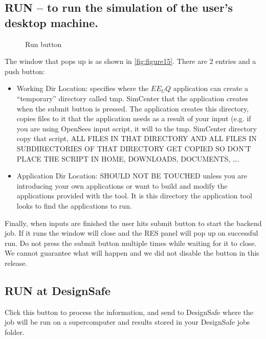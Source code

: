 \subsection{RUN – to run the simulation of the user’s desktop machine.}
\begin{figure}[!htbp]
  \caption{Run button}
  \label{fig:figure15}
\end{figure}
The window that pops up is as shown in \autoref{fig:figure15}. There are 2 entries and a push button: 

\begin{itemize}
\item Working Dir Location: specifies where the $EE_UQ$ application can create a “temporary” directory called tmp. SimCenter that the application 
creates when the submit button is pressed. The application creates this directory, copies files to it that the application needs as a result of your 
input (e.g. if you are using OpenSees input script, it will to the tmp. SimCenter directory copy that script, ALL FILES IN THAT DIRECTORY AND ALL FILES IN 
SUBDIRECTORIES OF THAT DIRECTORY GET COPIED SO DON’T PLACE THE SCRIPT IN HOME, DOWNLOADS, DOCUMENTS, ….
\item Application Dir Location: SHOULD NOT BE TOUCHED unless you are introducing your own applications or want to build and modify the 
applications provided with the tool. It is this directory the application tool looks to find the applications to run.
\end{itemize}


Finally, when inputs are finished the user hits submit button to start the backend job. If it runs the window will close and the RES 
panel will pop up on successful run. Do not press the submit button multiple times while waiting for it to close. We cannot guarantee 
what will happen and we did not disable the button in this release.

\subsection{RUN at DesignSafe}
Click this button to process the information, and send to DesignSafe where the job will be run on a supercomputer and results stored in your DesignSafe jobs folder.

